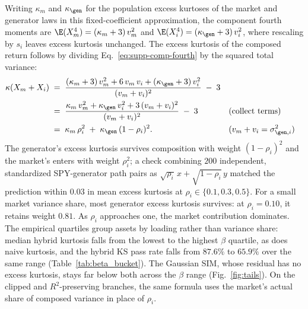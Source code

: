Writing $\kappa_m$ and $\kappa_{\gen}$ for the population excess kurtoses of the market and generator laws in this fixed-coefficient approximation, the component
fourth moments are $\E(X_m^4) = (\kappa_m + 3)\, v_m^2$ and
$\E(X_i^4) = (\kappa_{\gen} + 3)\, v_i^2$, where rescaling by $s_i$
leaves excess kurtosis unchanged. The excess kurtosis of the composed
return follows by dividing Eq.~\eqref{eq:supp-comp-fourth} by the
squared total variance:
\begin{align}
  \kappa(X_m + X_i)
   &\;=\; \frac{(\kappa_m + 3)\, v_m^2 + 6\, v_m\, v_i
     + (\kappa_{\gen} + 3)\, v_i^2}{(v_m + v_i)^2} \;-\; 3
     \notag \\
   &\;=\; \frac{\kappa_m\, v_m^2 + \kappa_{\gen}\, v_i^2
     + 3\, (v_m + v_i)^2}{(v_m + v_i)^2} \;-\; 3
     && \text{(collect terms)} \notag \\
   &\;=\; \kappa_m\, \rho_i^2 \;+\; \kappa_{\gen}\, (1 - \rho_i)^2.
     && \text{($v_m + v_i = \sigma_{\gen,i}^2$)}
  \label{eq:supp-kurt-comp}
\end{align}
The generator's excess kurtosis survives composition with weight
$(1 - \rho_i)^2$ and the market's enters with weight $\rho_i^2$; a check combining $200$ independent, standardized SPY-generator path pairs as $\sqrt{\rho_i}\,x+\sqrt{1-\rho_i}\,y$ matched the prediction within $0.03$ in mean excess kurtosis at $\rho_i\in\{0.1,0.3,0.5\}$. For a small market variance share, most generator excess kurtosis survives: at $\rho_i = 0.10$, it
retains weight $0.81$. As $\rho_i$ approaches one, the market contribution dominates.
The empirical quartiles group assets by loading rather than variance
share: median hybrid kurtosis falls from the lowest to the highest
$\beta$ quartile, as does naive kurtosis, and the hybrid KS pass rate
falls from $87.6\%$ to $65.9\%$ over the same range
(Table~\ref{tab:beta_bucket}). The Gaussian SIM, whose residual has no
excess kurtosis, stays far below both across the $\beta$ range
(Fig.~\ref{fig:tails}). On the clipped and $R^2$-preserving branches, the same formula uses the market's actual share of composed variance in place of $\rho_i$.

\begin{table}[H]
  \centering
  \caption{\textbf{Aggregate metrics by $\beta$ quartile, across composition methods.}
    Quartile cutoffs are computed from the calibrated $\beta$ distribution
    across the $423$-ticker universe. Pass rates pool equal numbers of paths per asset; other entries are medians across paths in the bucket. The GARCH rows use eligible fits among $393$ assets, while the other methods cover all $423$.}
  \label{tab:beta_bucket}
  \small
  
\end{table}

